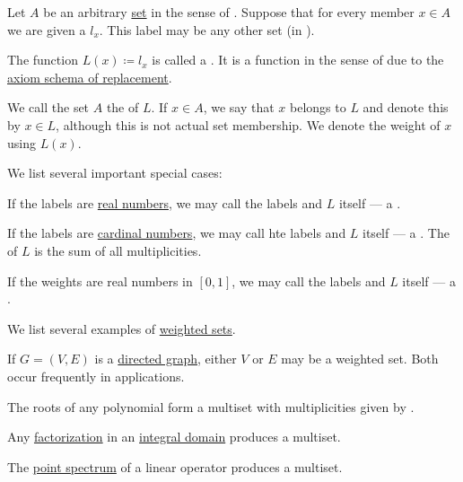\begin{definition}\label{def:labeled_set}
  Let \( A \) be an arbitrary \hyperref[def:set]{set} in the sense of \hyperref[def:zfc]{}. Suppose that for every member \( x \in A \) we are given a  \( l_x \). This label may be any other set (in ).

  The function \( L(x) \coloneqq l_x \) is called a . It is a function in the sense of  due to the \hyperref[def:zfc/replacement]{axiom schema of replacement}.

  We call the set \( A \) the  of \( L \). If \( x \in A \), we say that \( x \) belongs to \( L \) and denote this by \( x \in L \), although this is not actual set membership. We denote the weight of \( x \) using \( L(x) \).

  We list several important special cases:
  \begin{thmenum}
     If the labels are \hyperref[def:real_numbers]{real numbers}, we may call the labels  and \( L \) itself --- a .

     If the labels are \hyperref[def:cardinal]{cardinal numbers}, we may call hte labels  and \( L \) itself --- a . The  of \( L \) is the sum of all multiplicities.

     If the weights are real numbers in \( [0, 1] \), we may call the labels  and \( L \) itself --- a .
  \end{thmenum}
\end{definition}

\begin{example}\label{ex:def:labeled_set}
  We list several examples of \hyperref[def:labeled_set]{weighted sets}.

  \begin{itemize}
     If \( G = (V, E) \) is a \hyperref[def:directed_graph]{directed graph}, either \( V \) or \( E \) may be a weighted set. Both occur frequently in applications.

     The roots of any polynomial form a multiset with multiplicities given by .

     Any \hyperref[def:irreducible_factorization]{factorization} in an \hyperref[def:integral_domain]{integral domain} produces a multiset.

     The \hyperref[def:eigenpair]{point spectrum} of a linear operator produces a multiset.
  \end{itemize}
\end{example}

